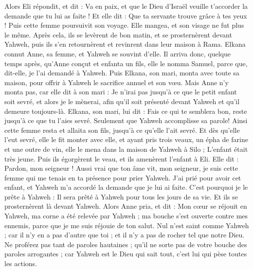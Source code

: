 \begin{multicols}{2}
Alors Eli répondit, et dit : Va en paix, et que le Dieu d'Israël veuille t'accorder la demande que tu lui as faite !
Et elle dit : Que ta servante trouve grâce à tes yeux ! Puis cette femme poursuivit son voyage. Elle mangea, et son visage ne fut plus le même.
Après cela, ils se levèrent de bon matin, et se prosternèrent devant Yahweh, puis ils s'en retournèrent et revinrent dans leur maison à Rama. Elkana connut Anne, sa femme, et Yahweh se souvint d'elle.
Il arriva donc, quelque temps après, qu'Anne conçut et enfanta un fils, elle le nomma Samuel, parce que, dit-elle, je l'ai demandé à Yahweh.
Puis Elkana, son mari, monta avec toute sa maison, pour offrir à Yahweh le sacrifice annuel et son vœu.
Mais Anne n'y monta pas, car elle dit à son mari : Je n'irai pas jusqu'à ce que le petit enfant soit sevré, et alors je le mènerai, afin qu'il soit présenté devant Yahweh et qu'il demeure toujours-là.
Elkana, son mari, lui dit : Fais ce qui te semblera bon, reste jusqu'à ce que tu l'aies sevré. Seulement que Yahweh accomplisse sa parole! Ainsi cette femme resta et allaita son fils, jusqu'à ce qu'elle l'ait sevré.
Et dès qu'elle l'eut sevré, elle le fit monter avec elle, et ayant pris trois veaux, un épha de farine et une outre de vin, elle le mena dans la maison de Yahweh à Silo ; L'enfant était très jeune.
Puis ils égorgèrent le veau, et ils amenèrent l'enfant à Eli.
Elle dit : Pardon, mon seigneur ! Aussi vrai que ton âme vit, mon seigneur, je suis cette femme qui me tenais en ta présence pour prier Yahweh.
J'ai prié pour avoir cet enfant, et Yahweh m'a accordé la demande que je lui ai faite.
C'est pourquoi je le prête à Yahweh : Il sera prêté à Yahweh pour tous les jours de sa vie. Et ils se prosternèrent là devant Yahweh.
\VerseOne{}Alors Anne pria, et dit : Mon cœur se réjouit en Yahweh, ma corne a été relevée par Yahweh ; ma bouche s'est ouverte contre mes ennemis, parce que je me suis réjouie de ton salut.
Nul n'est saint comme Yahweh ; car il n'y en a pas d'autre que toi ; et il n'y a pas de rocher tel que notre Dieu.
Ne proférez pas tant de paroles hautaines ; qu'il ne sorte pas de votre bouche des paroles arrogantes ; car Yahweh est le Dieu qui sait tout, c'est lui qui pèse toutes les actions.

\end{multicols}
